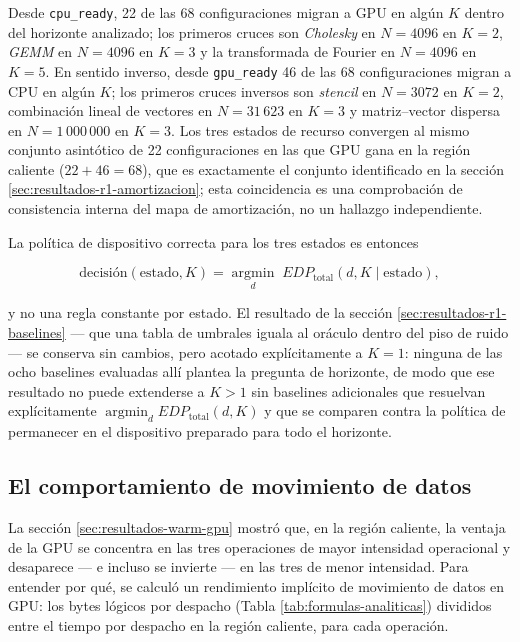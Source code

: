 \documentclass[12pt,oneside,spanish]{book}
\begin{document}
Desde \texttt{cpu\_ready}, 22 de las 68 configuraciones migran a GPU en algún $K$ dentro del horizonte analizado; los primeros cruces son \textit{Cholesky} en $N=4096$ en $K=2$, \textit{GEMM} en $N=4096$ en $K=3$ y la transformada de Fourier en $N=4096$ en $K=5$. En sentido inverso, desde \texttt{gpu\_ready} 46 de las 68 configuraciones migran a CPU en algún $K$; los primeros cruces inversos son \textit{stencil} en $N=3072$ en $K=2$, combinación lineal de vectores en $N=31\,623$ en $K=3$ y matriz--vector dispersa en $N=1\,000\,000$ en $K=3$. Los tres estados de recurso convergen al mismo conjunto asintótico de 22 configuraciones en las que GPU gana en la región caliente ($22 + 46 = 68$), que es exactamente el conjunto identificado en la sección \ref{sec:resultados-r1-amortizacion}; esta coincidencia es una comprobación de consistencia interna del mapa de amortización, no un hallazgo independiente.

La política de dispositivo correcta para los tres estados es entonces

\begin{equation*}
\text{decisión}(\text{estado}, K) = \operatorname*{argmin}_{d} \; EDP_{\text{total}}(d, K \mid \text{estado}),
\end{equation*}

y no una regla constante por estado. El resultado de la sección \ref{sec:resultados-r1-baselines} --- que una tabla de umbrales iguala al oráculo dentro del piso de ruido --- se conserva sin cambios, pero acotado explícitamente a $K=1$: ninguna de las ocho baselines evaluadas allí plantea la pregunta de horizonte, de modo que ese resultado no puede extenderse a $K>1$ sin baselines adicionales que resuelvan explícitamente $\operatorname*{argmin}_d EDP_{\text{total}}(d, K)$ y que se comparen contra la política de permanecer en el dispositivo preparado para todo el horizonte.

\subsection{El comportamiento de movimiento de datos}
\label{sec:resultados-r1-movimiento-datos}

La sección \ref{sec:resultados-warm-gpu} mostró que, en la región caliente, la ventaja de la GPU se concentra en las tres operaciones de mayor intensidad operacional y desaparece --- e incluso se invierte --- en las tres de menor intensidad. Para entender por qué, se calculó un rendimiento implícito de movimiento de datos en GPU: los bytes lógicos por despacho (Tabla \ref{tab:formulas-analiticas}) divididos entre el tiempo por despacho en la región caliente, para cada operación.
\end{document}
